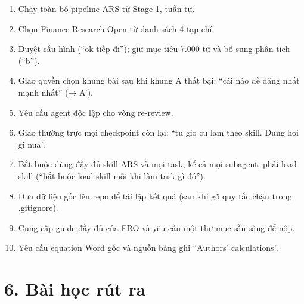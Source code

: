 \documentclass[12pt,a4paper]{article}
\providecommand{\tightlist}{\setlength{\itemsep}{0pt}\setlength{\parskip}{0pt}}
\begin{document}
\begin{enumerate}
\def\labelenumi{\arabic{enumi}.}
\tightlist
\item
  Chạy toàn bộ pipeline ARS từ Stage 1, tuần tự.
\item
  Chọn Finance Research Open từ danh sách 4 tạp chí.
\item
  Duyệt cấu hình (``ok tiếp đi''); giữ mục tiêu 7.000 từ và bổ sung phân
  tích (``b'').
\item
  Giao quyền chọn khung bài sau khi khung A thất bại: ``cái nào dễ đăng
  nhất mạnh nhất'' (→ A′).
\item
  Yêu cầu agent độc lập cho vòng re-review.
\item
  Giao thường trực mọi checkpoint còn lại: ``tu gio cu lam theo skill.
  Dung hoi gi nua''.
\item
  Bắt buộc dùng đầy đủ skill ARS và mọi task, kể cả mọi subagent, phải
  load skill (``bắt buộc load skill mỗi khi làm task gì đó'').
\item
  Đưa dữ liệu gốc lên repo để tái lập kết quả (sau khi gỡ quy tắc chặn
  trong .gitignore).
\item
  Cung cấp guide đầy đủ của FRO và yêu cầu một thư mục sẵn sàng để nộp.
\item
  Yêu cầu equation Word gốc và nguồn bảng ghi ``Authors' calculations''.
\end{enumerate}

\hypertarget{buxe0i-hux1ecdc-ruxfat-ra}{%
\section{6. Bài học rút ra}\label{buxe0i-hux1ecdc-ruxfat-ra}}
\end{document}
